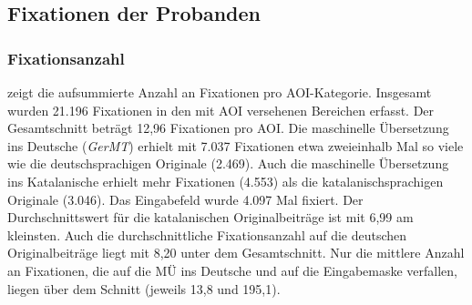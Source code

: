 


\subsection{Fixationen der Probanden}

\label{K6:sub:Fixationen:CatDe}




\subsubsection{Fixationsanzahl}
\label{K6:subsubsec:fixcount:CatDe}


 zeigt die aufsummierte Anzahl an Fixationen pro AOI-Kategorie. Insgesamt wurden 21.196 Fixationen in den mit AOI versehenen Bereichen erfasst. Der Gesamtschnitt beträgt 12,96 Fixationen pro AOI. Die maschinelle Übersetzung ins Deutsche (\emph{GerMT}) erhielt mit 7.037 Fixationen etwa zweieinhalb Mal so viele wie die deutschsprachigen Originale (2.469). Auch die maschinelle Übersetzung ins Katalanische erhielt mehr Fixationen (4.553) als die katalanischsprachigen Originale (3.046). Das Eingabefeld wurde 4.097 Mal fixiert. Der Durchschnittswert für die katalanischen Originalbeiträge ist mit 6,99 am kleinsten. Auch die durchschnittliche Fixationsanzahl auf die deutschen Originalbeiträge liegt mit 8,20 unter dem Gesamtschnitt. Nur die mittlere Anzahl an Fixationen, die auf die MÜ ins Deutsche und auf die Eingabemaske verfallen, liegen über dem Schnitt (jeweils 13,8 und 195,1).



